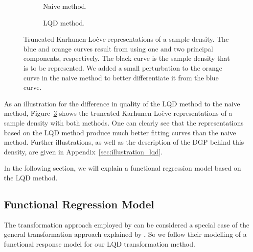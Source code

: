 \begin{figure}[h!]
    \centering
    \begin{subfigure}[b]{0.9\textwidth}
        \centering
        \resizebox{\linewidth}{!}{}
        \caption[Truncated representation --- naive]{Naive method.}
        \label{fig:naive_trunc_rep}
    \end{subfigure}
    \hfill %
    \begin{subfigure}[b]{0.9\textwidth}
        \centering
        \resizebox{\linewidth}{!}{}
        \caption[Truncated representation --- LQD method]{LQD method.}
        \label{fig:trunc_rep}
    \end{subfigure}
    \caption[Truncated Karhunen-Loève representations]{Truncated Karhunen-Loève
    representations of a sample density. The blue and orange curves result from using one
    and two principal components, respectively. The black curve is the sample density
    that is to be represented. We added a small perturbation to the orange curve in the
    naive method to better differentiate it from the blue curve.}
    \label{fig:trunc_reps}
\end{figure}

As an illustration for the difference in quality of the LQD method to the naive method,
Figure~\ref{fig:trunc_reps} shows the truncated Karhunen-Loève representations of a
sample density with both methods. One can clearly see that the representations based on
the LQD method produce much better fitting curves than the naive method. Further
illustrations, as well as the description of the DGP behind this density, are given in
Appendix~\ref{sec:illustration_lqd}.

In the following section, we will explain a functional regression model based on the
LQD method.

\subsection{Functional Regression Model}
\label{sec:func_reg_model}
The transformation approach employed by \textcite{TalskaEtAl2018} can be considered a
special case of the general transformation approach explained by \textcite{PetersenMüller2016}
\parencite[cf.][]{PetersenZhangKokoszka2022}. So we follow their modelling of a functional
response model for our LQD transformation method.

